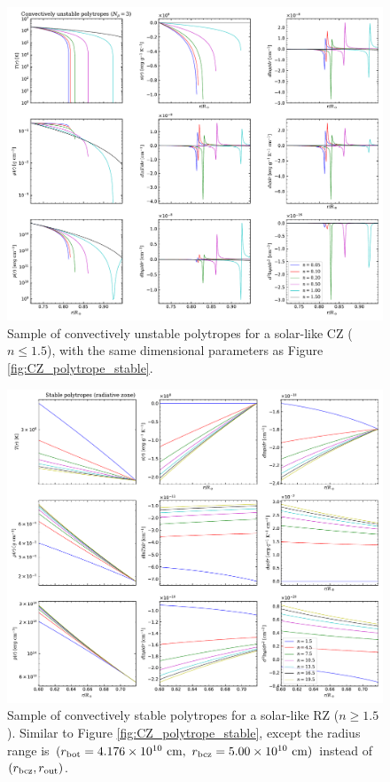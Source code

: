 \documentclass[12pt]{article}
\numberwithin{equation}{section}
\begin{document}
  \begin{figure}
	\includegraphics[scale=0.6]{figures/CZ_polytrope_unstable.pdf}
	\caption{Sample of convectively unstable polytropes for a solar-like CZ ($n\leq1.5$), with the same dimensional parameters as Figure \ref{fig:CZ_polytrope_stable}.}
	\label{fig:CZ_polytrope_unstable}
\end{figure}

  \begin{figure}
	\includegraphics[scale=0.6]{figures/RZ_polytrope_stable.pdf}
	\caption{Sample of convectively stable polytropes for a solar-like RZ ($n\geq1.5$). Similar to Figure \ref{fig:CZ_polytrope_stable}, except the radius range is $(r\bott=4.176\times10^{10}\ {\rm{cm}},\ r\bcz=5.00\times10^{10}\ \rm{cm})$ instead of $(r_{\rm{bcz}},r_{\rm{out}})$.}
	\label{fig:RZ_polytrope_stable}
\end{figure}
\end{document}
